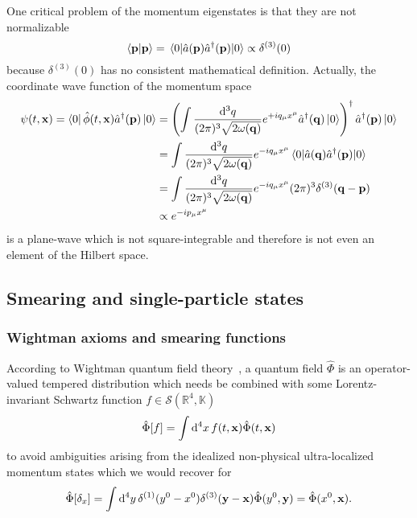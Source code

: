 One critical problem of the momentum eigenstates is that they are not normalizable
\begin{equation}
	\bra{\vb{p}}\ket{\vb{p}}
	=
	\expval{\hat{a}(\vb{p})\hat{a}^\dagger(\vb{p})}{0}
	\propto
	\delta^{(3)}(0)
\end{equation}
because $\delta^{(3)}(0)$ has no consistent mathematical definition.
Actually, the coordinate wave function of the momentum space~\cite[p.~25]{Peskin1995}
\begin{equation}
	\begin{split}
		\psi(t,\vb{x})
		=
		\bra{0}
		\hat\phi(t,\vb{x})
		\hat{a}^\dagger(\vb{p})
		\ket{0}
		&=
		\left(
			\int\frac{\dd[3]{q}}{(2\pi)^3\sqrt{2\omega(\vb{q})}}
			e^{+iq_\mu x^\mu}
			\hat{a}^\dagger(\vb{q})
			\ket{0}
		\right)^\dagger
		\hat{a}^\dagger(\vb{p})
		\ket{0}
		\\
		&=
		\int\frac{\dd[3]{q}}{(2\pi)^3\sqrt{2\omega(\vb{q})}}
		e^{-iq_\mu x^\mu}
		\expval{\hat{a}(\vb{q})\hat{a}^\dagger(\vb{p})}{0}
		\\
		&=
		\int\frac{\dd[3]{q}}{(2\pi)^3\sqrt{2\omega(\vb{q})}}
		e^{-iq_\mu x^\mu}
		(2\pi)^3
		\delta^{(3)}(\vb{q}-\vb{p})
		\\
		&\propto
		e^{-ip_\mu x^\mu}
	\end{split}
\end{equation}
is a plane-wave which is not square-integrable and therefore is not even an element of the Hilbert space.

\subsection{Smearing and single-particle states}

\subsubsection{Wightman axioms and smearing functions}

According to Wightman quantum field theory~\cite[p.~324]{Bogolubov1989}, a quantum field $\hat\Phi$ is an operator-valued tempered distribution which needs be combined with some Lorentz-invariant Schwartz function $f\in\mathcal{S}(\mathbb{R}^4,\mathbb{K})$
\begin{equation}
	\hat\Phi[f]
	=
	\int\dd[4]{x}
	f(t,\vb{x})
	\hat\Phi(t,\vb{x})
\end{equation}
to avoid ambiguities arising from the idealized non-physical ultra-localized momentum states which we would recover for
\begin{equation}
	\hat\Phi[\delta_x]
	=
	\int\dd[4]{y}
	\delta^{(1)}(y^0-x^0)
	\delta^{(3)}(\vb{y}-\vb{x})
	\hat\Phi(y^0,\vb{y})
	=
	\hat\Phi(x^0,\vb{x})
	.
\end{equation}

